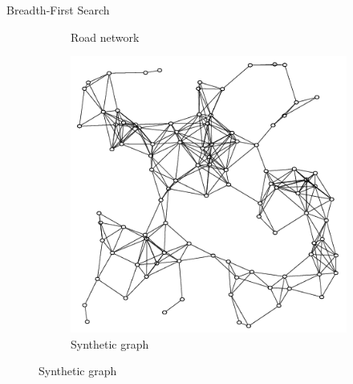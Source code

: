 \begin{frame}{Breadth-First Search}
\begin{figure}
\begin{subfigure}[b]{0.32\textwidth}
            \caption{Road network}
        \end{subfigure}
        \pause
        \hfill
        \begin{subfigure}[b]{0.32\textwidth}
            \centering
            \includegraphics[width=0.8\linewidth]{images/A-random-geometric-graph.png}
            \caption{Synthetic graph}
        \end{subfigure}
    \end{figure}
\end{frame}

